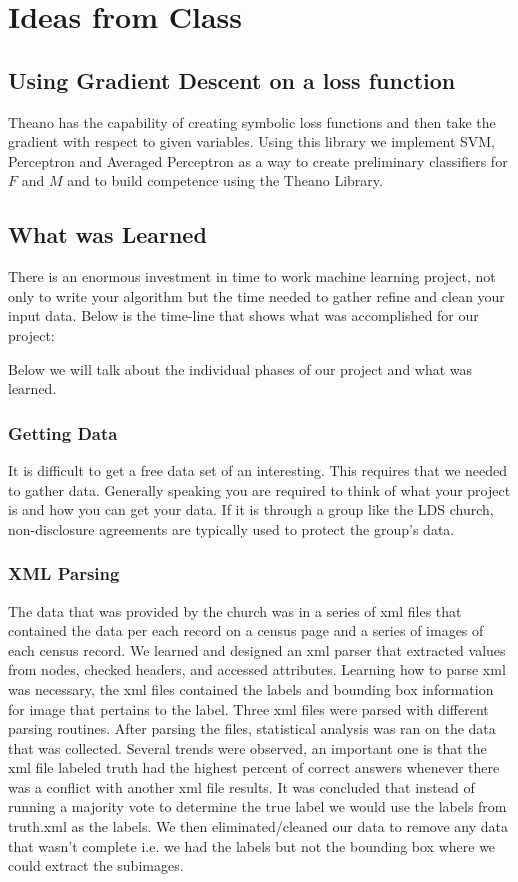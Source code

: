 \documentclass[11pt]{article}
\begin{document}
\section{Ideas from Class}

\subsection{Using Gradient Descent on a loss function}
Theano has the capability of creating symbolic loss functions and then take the gradient with respect to given variables.  Using this library we implement SVM, Perceptron and Averaged Perceptron as a way to create preliminary classifiers for $F$ and $M$ and to build competence using the Theano Library.

\subsection{What was Learned}
There is an enormous investment in time to work machine learning project, not only to write your algorithm but the time needed to gather refine and clean your input data.  Below is the time-line that shows what was accomplished for our project:

Below we will talk about the individual phases of our project and what was learned.

\subsubsection{Getting Data}
It is difficult to get a free data set of an interesting.  This requires that we needed to gather data.  Generally speaking you are required to think of what your project is and how you can get your data.  If it is through a group like the LDS church, non-disclosure agreements are typically used to protect the group’s data.

\subsubsection{XML Parsing}
The data that was provided by the church was in a series of xml files that contained the data per each record on a census page and a series of images of each census record.  We learned and designed an xml parser that extracted values from nodes, checked headers, and  accessed attributes.  Learning how to parse xml was necessary, the xml files contained the labels and bounding box information for image that pertains to the label.  Three xml files were parsed with different parsing routines.  After parsing the files, statistical analysis was ran on the data that was collected.  Several trends were observed, an important one is that the xml file labeled truth had the highest percent of correct answers whenever there was a conflict with another xml file results. It was concluded that instead of running a majority vote to determine the true label we would use the labels from truth.xml as the labels. We then eliminated/cleaned our data to remove any data that wasn’t complete i.e. we had the labels but not the bounding box where we could extract the subimages.
\end{document}
